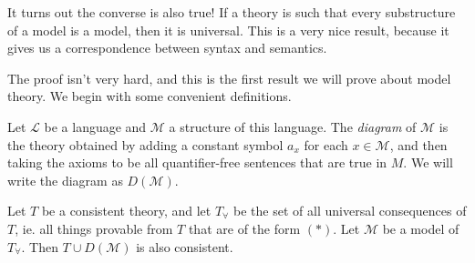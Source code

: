 \documentclass[a4paper]{article}
\begin{document}
It turns out the converse is also true! If a theory is such that every substructure of a model is a model, then it is universal. This is a very nice result, because it gives us a correspondence between syntax and semantics.

The proof isn't very hard, and this is the first result we will prove about model theory. We begin with some convenient definitions.
\begin{defi}[Diagram]
  Let $\mathcal{L}$ be a language and $\mathcal{M}$ a structure of this language. The \emph{diagram} of $\mathcal{M}$ is the theory obtained by adding a constant symbol $a_x$ for each $x \in \mathcal{M}$, and then taking the axioms to be all quantifier-free sentences that are true in $M$. We will write the diagram as $D(\mathcal{M})$.
%
\end{defi}
%
%
%
%

\begin{lemma}
  Let $T$ be a consistent theory, and let $T_{\forall}$ be the set of all universal consequences of $T$, ie. all things provable from $T$ that are of the form $(*)$. Let $\mathcal{M}$ be a model of $T_\forall$. Then $T \cup D(\mathcal{M})$ is also consistent.
\end{lemma}
\end{document}
